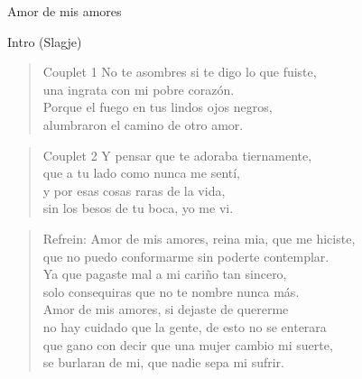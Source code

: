 \begin{song}[vals]{Amor de mis amores}
\begin{instrumental}{Intro (Slagje)}
	  \measure{}\measure{}\measure{\hspace{3.5em}:}
\end{instrumental}

\begin{verse}{Couplet 1}
No te asombres si te digo lo que fuiste,\\
una ingrata con mi pobre corazón.\\
Porque el fuego en tus lindos ojos negros,\\
alumbraron el camino de otro amor.\\
\end{verse}
\begin{verse}{Couplet 2}
Y pensar que te adoraba tiernamente,\\
que a tu lado como nunca me sentí,\\
y por esas cosas raras de la vida,\\
sin los besos de tu boca, yo me vi.  \\
\end{verse}
\begin{verse}{Refrein:}
Amor de mis amores, reina mia, que me hiciste,\\
que no puedo conformarme sin poderte contemplar.\\
\hspace{1em}Ya que pagaste mal a mi cariño tan sincero,\\
solo consequiras que no te nombre nunca más.\\
Amor de mis amores, si dejaste de quererme\\
no hay cuidado que la gente, de esto no se enterara\\
\hspace{1em}que gano con decir que una mujer cambio mi suerte,\\
se burlaran de mi, que nadie sepa mi sufrir.   
\end{verse}


\end{song}
